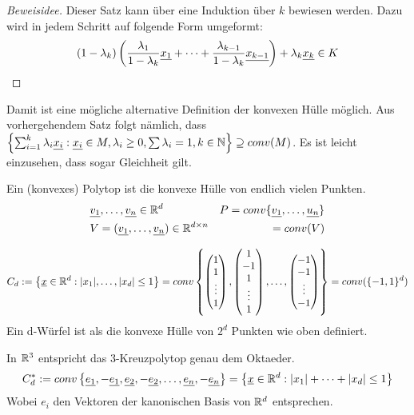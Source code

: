 \begin{proof}[Beweisidee]
Dieser Satz kann über eine Induktion über $k$ bewiesen werden. Dazu wird in jedem Schritt 
auf folgende Form umgeformt:
\begin{align*}
(1-\lambda_k)\left(\frac{\lambda_1}{1-\lambda_k}\ul{x_1}+\dots+%
                \frac{\lambda_{k-1}}{1-\lambda_k}\ul{x_{k-1}}\right)+\lambda_k\ul{x_k} \in K
\end{align*}
\end{proof}
Damit ist eine mögliche alternative Definition der konvexen Hülle möglich. Aus vorhergehendem Satz
folgt nämlich, dass $\left\{\sum_{i=1}^k\lambda_i\underline{x_i}:\underline{x_i}\in M, \lambda_i\geq0, 
    \sum\lambda_i=1, k\in\mathbb{N}\right\}\supseteq conv(M)$. Es ist leicht einzusehen, dass sogar 
Gleichheit gilt. 

\begin{defi}
Ein (konvexes) Polytop ist die konvexe Hülle von endlich vielen Punkten.
\begin{align*}
&\underline{v_1},\dots,\underline{v_n}\in\mathbb{R}^d                &P=conv\{\underline{v_1},\dots,\underline{u_n}\} \\
&V=(\underline{v_1},\dots,\underline{v_n})\in\mathbb{R}^{d\times n}  & =conv(V) 
\end{align*}
\end{defi}

\begin{bsp}[d-Würfel]
\begin{equation*}
    C_d:=\left\{\ul{x}\in\bbR^d:|x_1|,\dots,|x_d|\leq1\right\}%
    =conv\left\{\begin{pmatrix}1\\1\\\vdots\\1\end{pmatrix},
                \begin{pmatrix}1\\-1\\1\\\vdots\\1\end{pmatrix},
                \dots,
                \begin{pmatrix}-1\\-1\\\vdots\\-1\end{pmatrix} \right\}=conv(\{-1, 1\}^d) 
\end{equation*}
Ein d-Würfel ist als die konvexe Hülle von $2^d$ Punkten wie oben definiert.
\end{bsp}

\begin{bsp}[d-Kreuzpolytop]
In $\mathbb{R}^3$ entspricht das 3-Kreuzpolytop genau dem Oktaeder.
\begin{equation*}
C_d^\ast:=conv\left\{\ul{e_1},-\ul{e_1},\ul{e_2},-\ul{e_2},\dots,\ul{e_n},-\ul{e_n}\right\} %
=\left\{\ul{x}\in\bbR^d:|x_1|+\dots+|x_d|\leq1\right\}
\end{equation*}
Wobei $e_i$ den Vektoren der kanonischen Basis von $\mathbb{R}^d$ entsprechen.
\end{bsp}
